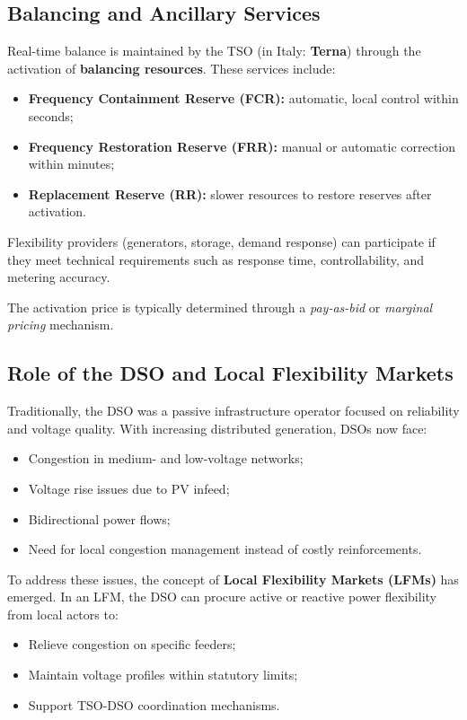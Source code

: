 \documentclass[11pt]{article}
\begin{document}
	\subsection{Balancing and Ancillary Services}
	
	Real-time balance is maintained by the TSO (in Italy: \textbf{Terna}) through the activation of \textbf{balancing resources}.  
	These services include:
	\begin{itemize}
		\item \textbf{Frequency Containment Reserve (FCR):} automatic, local control within seconds;
		\item \textbf{Frequency Restoration Reserve (FRR):} manual or automatic correction within minutes;
		\item \textbf{Replacement Reserve (RR):} slower resources to restore reserves after activation.
	\end{itemize}
	
	Flexibility providers (generators, storage, demand response) can participate if they meet technical requirements such as response time, controllability, and metering accuracy.
	
	The activation price is typically determined through a \textit{pay-as-bid} or \textit{marginal pricing} mechanism.
	
	\subsection{Role of the DSO and Local Flexibility Markets}
	
	Traditionally, the DSO was a passive infrastructure operator focused on reliability and voltage quality.  
	With increasing distributed generation, DSOs now face:
	\begin{itemize}
		\item Congestion in medium- and low-voltage networks;
		\item Voltage rise issues due to PV infeed;
		\item Bidirectional power flows;
		\item Need for local congestion management instead of costly reinforcements.
	\end{itemize}
	
	To address these issues, the concept of \textbf{Local Flexibility Markets (LFMs)} has emerged.  
	In an LFM, the DSO can procure active or reactive power flexibility from local actors to:
	\begin{itemize}
		\item Relieve congestion on specific feeders;
		\item Maintain voltage profiles within statutory limits;
		\item Support TSO-DSO coordination mechanisms.
	\end{itemize}
	
\end{document}
